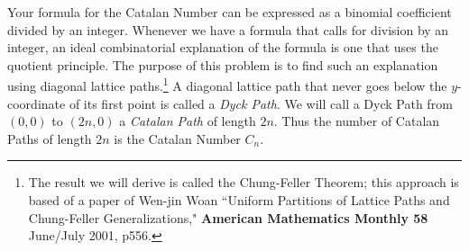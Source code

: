 \itemi Your formula for the Catalan Number can be expressed as a binomial
coefficient divided by an integer.  Whenever we have a formula that calls
for division by an integer, an ideal combinatorial explanation of the
formula is one that uses the quotient principle.  The purpose of this
problem is to find such an explanation using diagonal lattice
paths.\footnote{The result we will derive is called the Chung-Feller
Theorem; this approach is based of a paper of
Wen-jin Woan ``Uniform Partitions of Lattice Paths and Chung-Feller
Generalizations," {\bf American Mathematics Monthly 58} June/July 2001,
p556.}  A diagonal lattice path that never goes below the
$y$-coordinate of its first point is called a {\em Dyck Path}.  We will call a Dyck Path from
$(0,0)$ to
$(2n,0)$ a {\em Catalan Path} of length $2n$.  Thus the
number of Catalan Paths of length $2n$ is the Catalan Number $C_n$.
